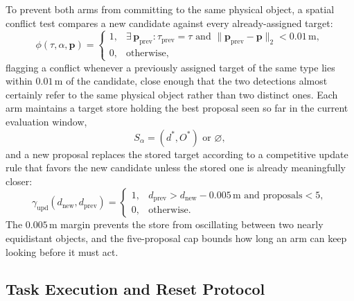 To prevent both arms from committing to the same physical object, a spatial conflict test compares a
new candidate against every already-assigned target:
\begin{equation}
\phi(\tau, \alpha, \mathbf{p}) =
\begin{cases}
1, & \exists\, \mathbf{p}_{\text{prev}} : \tau_{\text{prev}} = \tau \text{ and } \lVert \mathbf{p}_{\text{prev}} - \mathbf{p} \rVert_2 < 0.01\,\text{m}, \\
0, & \text{otherwise},
\end{cases}
\label{eq:cta_conflict}
\end{equation}
flagging a conflict whenever a previously assigned target of the same type lies within $0.01$\,m of
the candidate, close enough that the two detections almost certainly refer to the same physical
object rather than two distinct ones. Each arm maintains a target store holding the best proposal
seen so far in the current evaluation window,
\begin{equation}
S_\alpha = (d^*, O^*) \text{ or } \varnothing,
\label{eq:cta_store}
\end{equation}
and a new proposal replaces the stored target according to a competitive update rule that favors
the new candidate unless the stored one is already meaningfully closer:
\begin{equation}
\gamma_{\text{upd}}(d_{\text{new}}, d_{\text{prev}}) =
\begin{cases}
1, & d_{\text{prev}} > d_{\text{new}} - 0.005\,\text{m} \text{ and proposals} < 5, \\
0, & \text{otherwise}.
\end{cases}
\label{eq:cta_update}
\end{equation}
The $0.005$\,m margin prevents the store from oscillating between two nearly equidistant objects,
and the five-proposal cap bounds how long an arm can keep looking before it must act.

\subsection{Task Execution and Reset Protocol}\label{subsec:cta_execution}

